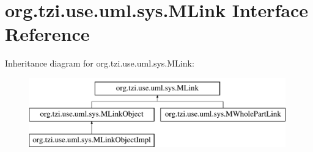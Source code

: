 \hypertarget{interfaceorg_1_1tzi_1_1use_1_1uml_1_1sys_1_1_m_link}{\section{org.\-tzi.\-use.\-uml.\-sys.\-M\-Link Interface Reference}
\label{interfaceorg_1_1tzi_1_1use_1_1uml_1_1sys_1_1_m_link}
}
Inheritance diagram for org.\-tzi.\-use.\-uml.\-sys.\-M\-Link\-:\begin{figure}[H]
\begin{center}
\leavevmode
\includegraphics[height=3.000000cm]{interfaceorg_1_1tzi_1_1use_1_1uml_1_1sys_1_1_m_link}
\end{center}
\end{figure}

